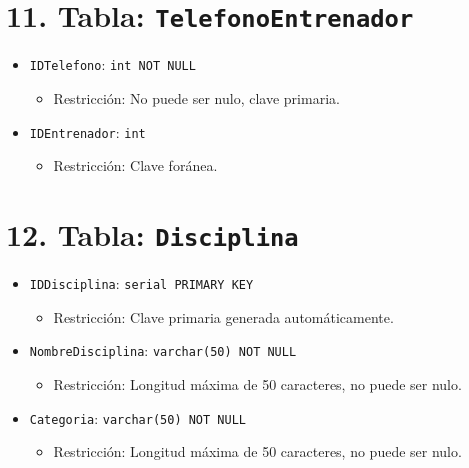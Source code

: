 \section*{11. Tabla: \texttt{TelefonoEntrenador}}
\begin{itemize}
    \item \texttt{IDTelefono}: \texttt{int NOT NULL}
    \begin{itemize}
        \item Restricción: No puede ser nulo, clave primaria.
    \end{itemize}
    \item \texttt{IDEntrenador}: \texttt{int}
    \begin{itemize}
        \item Restricción: Clave foránea.
    \end{itemize}
\end{itemize}

\section*{12. Tabla: \texttt{Disciplina}}
\begin{itemize}
    \item \texttt{IDDisciplina}: \texttt{serial PRIMARY KEY}
    \begin{itemize}
        \item Restricción: Clave primaria generada automáticamente.
    \end{itemize}
    \item \texttt{NombreDisciplina}: \texttt{varchar(50) NOT NULL}
    \begin{itemize}
        \item Restricción: Longitud máxima de 50 caracteres, no puede ser nulo.
    \end{itemize}
    \item \texttt{Categoria}: \texttt{varchar(50) NOT NULL}
    \begin{itemize}
        \item Restricción: Longitud máxima de 50 caracteres, no puede ser nulo.
    \end{itemize}
\end{itemize}

